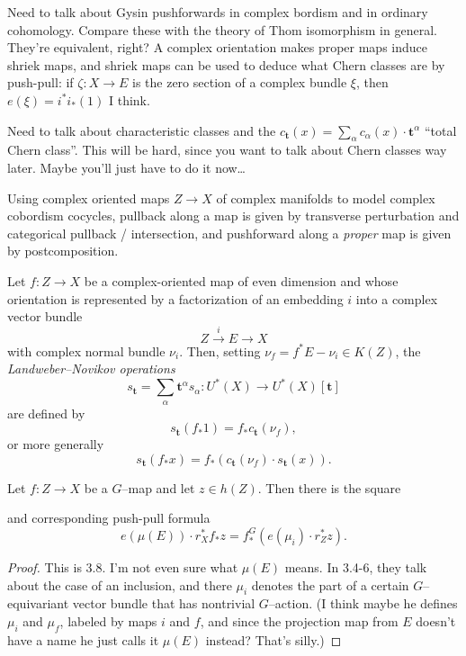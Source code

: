Need to talk about Gysin pushforwards in complex bordism and in ordinary cohomology.  Compare these with the theory of Thom isomorphism in general.  They're equivalent, right?  A complex orientation makes proper maps induce shriek maps, and shriek maps can be used to deduce what Chern classes are by push-pull: if $\zeta: X \to E$ is the zero section of a complex bundle $\xi$, then $e(\xi) = i^* i_*(1)$ I think.

Need to talk about characteristic classes and the $c_{\mathbf t}(x) = \sum_\alpha c_\alpha(x) \cdot \mathbf t^\alpha$ ``total Chern class''.  This will be hard, since you want to talk about Chern classes way later.  Maybe you'll just have to do it now\ldots

\begin{definition}
Using complex oriented maps $Z \to X$ of complex manifolds to model complex cobordism cocycles, pullback along a map is given by transverse perturbation and categorical pullback / intersection, and pushforward along a \emph{proper} map is given by postcomposition.
\end{definition}

\begin{definition}
Let $f: Z \to X$ be a complex-oriented map of even dimension and whose orientation is represented by a factorization of an embedding $i$ into a complex vector bundle \[Z \xrightarrow i E \to X\] with complex normal bundle $\nu_i$.  Then, setting $\nu_f = f^* E - \nu_i \in K(Z)$, the \textit{Landweber--Novikov operations} \[s_{\mathbf t} = \sum_\alpha \mathbf t^\alpha s_\alpha: U^*(X) \to U^*(X)[\mathbf t]\] are defined by \[s_{\mathbf t}(f_* 1) = f_* c_{\mathbf t}(\nu_f),\] or more generally \[s_{\mathbf t}(f_* x) = f_*(c_{\mathbf t}(\nu_f) \cdot s_{\mathbf t}(x)).\]
\end{definition}

\begin{theorem}
Let $f: Z \to X$ be a $G$--map and let $z \in h(Z)$.  Then there is the square
\begin{center}
\end{center}
and corresponding push-pull formula \[e(\mu(E)) \cdot r_X^* f_* z = f^G_*(e(\mu_i) \cdot r_Z^* z).\]
\end{theorem}
\begin{proof}
This is 3.8. I'm not even sure what $\mu(E)$ means. In 3.4-6, they talk about the case of an inclusion, and there $\mu_i$ denotes the part of a certain $G$--equivariant vector bundle that has nontrivial $G$--action.  (I think maybe he defines $\mu_i$ and $\mu_f$, labeled by maps $i$ and $f$, and since the projection map from $E$ doesn't have a name he just calls it $\mu(E)$ instead?  That's silly.)
\end{proof}

